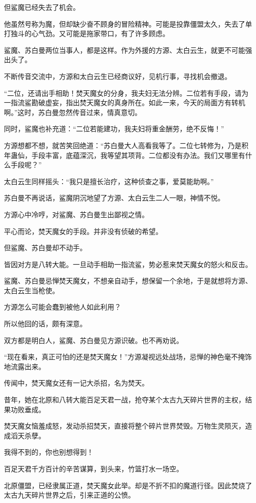 \begin{this_body}
但鲨魔已经失去了机会。

他虽然号称为魔，但却缺少奋不顾身的冒险精神。可能是投靠僵盟太久，失去了单打独斗的心气劲。又可能是拖家带口，有了许多顾虑。

鲨魔、苏白曼两位当事人，都是这样。作为外援的方源、太白云生，就更不可能强出头了。

不断传音交流中，方源和太白云生已经商议好，见机行事，寻找机会撤退。

“二位，还请出手相助！焚天魔女的分身，我夫妇无法分辨。二位若有手段，请为一指流鲨勘破虚妄，指出焚天魔女的真身所在。如此一来，今天的局面方有转机啊。”这时，苏白曼忽然传音过来，情真意切。

同时，鲨魔也补充道：“二位若能建功，我夫妇将重金酬劳，绝不反悔！”

方源想都不想，就苦笑回绝道：“苏白曼大人高看我等了。二位七转修为，乃是积年蛊仙，手段丰富，底蕴深沉，我等望其项背。二位都没有办法。我们又哪里有什么手段呢？”

太白云生同样摇头：“我只是擅长治疗，这种侦查之事，爱莫能助啊。”

苏白曼不再说话，鲨魔阴沉地望了方源、太白云生二人一眼，神情不悦。

方源心中冷哼，对鲨魔、苏白曼生出鄙视之情。

平心而论，焚天魔女的手段。并非没有侦破的希望。

但鲨魔、苏白曼却不动手。

皆因对方是八转大能。一旦动手相助一指流鲨，势必惹来焚天魔女的怒火和反击。

鲨魔、苏白曼忌惮焚天魔女，不想亲自动手，想保留一个余地，于是就想将方源、太白云生当枪使。

方源怎么可能会蠢到被他人如此利用？

所以他回的话，颇有深意。

双方都是明白人，鲨魔、苏白曼见方源识破。也不再劝说。

“现在看来，真正可怕的还是焚天魔女！”方源凝视远处战场，忌惮的神色毫不掩饰地流露出来。

传闻中，焚天魔女还有一记大杀招，名为焚天。

昔年，她在北原和八转大能百足天君一战，抢夺某个太古九天碎片世界的主权，结果功败垂成。

焚天魔女恼羞成怒，发动杀招焚天，直接将整个碎片世界焚毁。万物生灵陨灭，造成滔天杀孽。

我得不到的，你也别想得到！

百足天君千方百计的辛苦谋算，到头来，竹篮打水一场空。

北原僵盟，已经隶属正道，焚天魔女此举。却是不折不扣的魔道行径。因此焚烧了太古九天碎片世界之后，引来正道的公愤。


\end{this_body}
